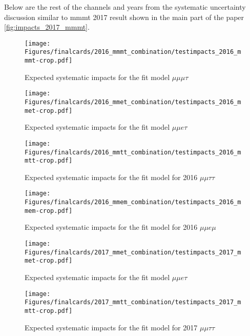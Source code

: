 

Below are the rest of the channels and years from the systematic uncertainty discussion similar to mmmt 2017 result shown in the main part of the paper \ref{fig:impacts_2017_mmmt}. 

\begin{figure}[ht!b]
    \centering 
\texttt{[image: Figures/finalcards/2016\_mmmt\_combination/testimpacts\_2016\_mmmt-crop.pdf]}
    \caption{\label{fig:impacts_2016_mmmt} Expected systematic impacts for the fit model $\mu\mu\mu\tau$}
\end{figure}

\begin{figure}[ht!b]
    \centering 
\texttt{[image: Figures/finalcards/2016\_mmet\_combination/testimpacts\_2016\_mmet-crop.pdf]}
    \caption{\label{fig:impacts_2016_mmet} Expected systematic impacts for the fit model $\mu\mu e \tau$}
\end{figure}

\begin{figure}[ht!b]
    \centering 
\texttt{[image: Figures/finalcards/2016\_mmtt\_combination/testimpacts\_2016\_mmtt-crop.pdf]}
    \caption{\label{fig:impacts_2016_mmtt} Expected systematic impacts for the fit model for 2016 $\mu\mu\tau\tau$}
\end{figure}

\begin{figure}[ht!b]
    \centering 
\texttt{[image: Figures/finalcards/2016\_mmem\_combination/testimpacts\_2016\_mmem-crop.pdf]}
    \caption{\label{fig:impacts_2016_mmem} Expected systematic impacts for the fit model for 2016 $\mu\mu e \mu$}
\end{figure}


\begin{figure}[ht!b]
    \centering 
\texttt{[image: Figures/finalcards/2017\_mmet\_combination/testimpacts\_2017\_mmet-crop.pdf]}
    \caption{\label{fig:impacts_2017_mmet} Expected systematic impacts for the fit model $\mu\mu e \tau$}
\end{figure}

\begin{figure}[ht!b]
    \centering 
\texttt{[image: Figures/finalcards/2017\_mmtt\_combination/testimpacts\_2017\_mmtt-crop.pdf]}
    \caption{\label{fig:impacts_2017_mmtt} Expected systematic impacts for the fit model for 2017 $\mu\mu\tau\tau$}
\end{figure}

